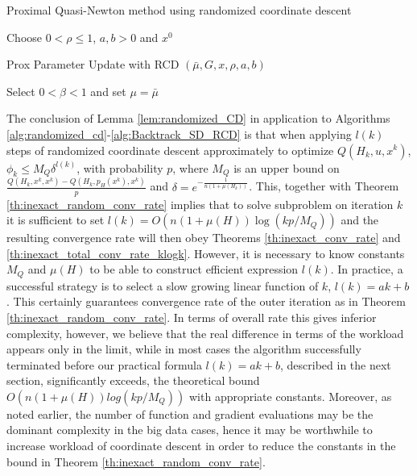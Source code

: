 \documentclass[11pt]{article}
\numberwithin{equation}{section}
\begin{document}
\begin{algorithm2e}\caption{Proximal Quasi-Newton method using randomized coordinate descent}
    \label{alg:ISTA-SD_RCD}%
{\rm Choose }
$0<\rho\leq 1$,  $a,b>0$ and  $x^0$\; 
\end{algorithm2e}




\begin{algorithm2e}\caption{Prox Parameter Update with RCD $(\bar \mu, G, x, \rho, a,b)$ }
    \label{alg:Backtrack_SD_RCD}%
Select $0<\beta<1$ and set $\mu=\bar \mu$\; 
\end{algorithm2e}


 The  conclusion of Lemma \ref{lem:randomized_CD} in application to Algorithms \ref{alg:randomized_cd}-\ref{alg:Backtrack_SD_RCD} 
 is that  when applying $l(k)$ steps of  randomized coordinate descent 
 approximately to optimize $Q(H_k,  u,x^k)$, $\phi_k\leq M_Q\delta^{l(k)}$, with probability $p$, where  
 $M_Q$ is an upper bound on  $\frac{Q(H_k,x^k, x^k) - Q(H_k, p_H(x^k), x^k)}{p}$ and $\delta=e^{-\frac{1}{n(1+\mu(H_k))}}$.
 This, together with Theorem \ref{th:inexact_random_conv_rate} implies that to solve subproblem on iteration $k$ it is sufficient to set 
 $l(k)=O(n(1+\mu(H))\log(kp/M_Q))$ and the resulting convergence rate will then obey
  Theorems \ref{th:inexact_conv_rate} and \ref{th:inexact_total_conv_rate_klogk}. 
   However, it is necessary to know constants $M_Q$ 
   and $\mu(H)$ to be able to construct efficient expression $l(k)$.
 In practice, a successful strategy
 is to select a slow growing linear function  of $k$, $l(k)=ak+b$. This certainly guarantees convergence rate of the outer iteration as in Theorem \ref{th:inexact_random_conv_rate}. In terms of overall rate this gives inferior complexity, however, we believe that the real difference in
  terms of the workload appears only in the limit, while in most cases the algorithm successfully terminated before  our practical formula $l(k)=ak+b$, described in the next section, significantly exceeds, the theoretical bound $O(n(1+\mu(H))log(kp/M_Q))$ with appropriate constants. Moreover, as noted earlier, the number of function 
  and gradient evaluations may be the dominant complexity in the big data cases, 
  hence it may be worthwhile to increase workload of coordinate descent  in order to reduce the constants in the bound in
   Theorem \ref{th:inexact_random_conv_rate}. 
   
\end{document}
